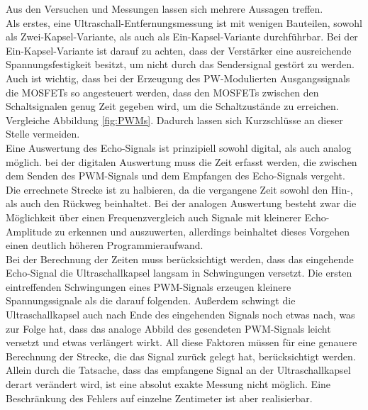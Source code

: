 Aus den Versuchen und Messungen lassen sich mehrere Aussagen treffen. \\
Als erstes, eine Ultraschall-Entfernungsmessung ist mit wenigen Bauteilen, sowohl als Zwei-Kapsel-Variante, als auch als Ein-Kapsel-Variante durchführbar. Bei der Ein-Kapsel-Variante ist darauf zu achten, dass der Verstärker eine ausreichende Spannungsfestigkeit besitzt, um nicht durch das Sendersignal gestört zu werden. Auch ist wichtig, dass bei der Erzeugung des PW-Modulierten Ausgangssignals die MOSFETs so angesteuert werden, dass den MOSFETs zwischen den Schaltsignalen genug Zeit gegeben wird, um die Schaltzustände zu erreichen. Vergleiche Abbildung \ref{fig:PWMs}. Dadurch lassen sich Kurzschlüsse an dieser Stelle vermeiden.\\
Eine Auswertung des Echo-Signals ist prinzipiell sowohl digital, als auch analog möglich. bei der digitalen Auswertung muss die Zeit erfasst werden, die zwischen dem Senden des PWM-Signals und dem Empfangen des Echo-Signals vergeht. Die errechnete Strecke ist zu halbieren, da die vergangene Zeit sowohl den Hin-, als auch den Rückweg beinhaltet. Bei der analogen Auswertung besteht zwar die Möglichkeit über einen Frequenzvergleich auch Signale mit kleinerer Echo-Amplitude zu erkennen und auszuwerten, allerdings beinhaltet dieses Vorgehen einen deutlich höheren Programmieraufwand.\\
Bei der Berechnung der Zeiten muss berücksichtigt werden, dass das eingehende Echo-Signal die Ultraschallkapsel langsam in Schwingungen versetzt. Die ersten eintreffenden Schwingungen eines PWM-Signals erzeugen kleinere Spannungssignale als die darauf folgenden. Außerdem schwingt die Ultraschallkapsel auch nach Ende des eingehenden Signals noch etwas nach, was zur Folge hat, dass das analoge Abbild des gesendeten PWM-Signals leicht versetzt und etwas verlängert wirkt. All diese Faktoren müssen für eine genauere Berechnung der Strecke, die das Signal zurück gelegt hat, berücksichtigt werden. Allein durch die Tatsache, dass das empfangene Signal an der Ultraschallkapsel derart verändert wird, ist eine absolut exakte Messung nicht möglich. Eine Beschränkung des Fehlers auf einzelne Zentimeter ist aber realisierbar.\\
